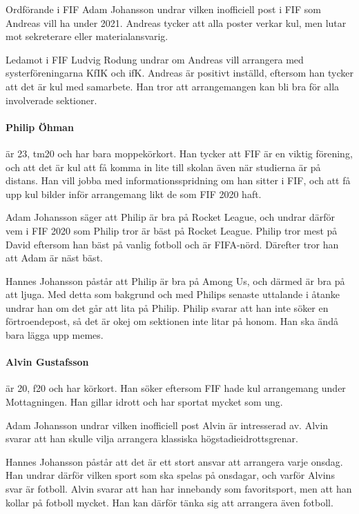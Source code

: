 \documentclass[hidelinks]{sektionsmote}
\begin{document}
Ordförande i FIF Adam Johansson undrar vilken inofficiell post i FIF som Andreas vill ha under 2021.
Andreas tycker att alla poster verkar kul, men lutar mot sekreterare eller materialansvarig.

Ledamot i FIF Ludvig Rodung undrar om Andreas vill arrangera med systerföreningarna KfIK och ifK.
Andreas är positivt inställd, eftersom han tycker att det är kul med samarbete.
Han tror att arrangemangen kan bli bra för alla involverade sektioner.

\paragraph{Philip Öhman} är 23, tm20 och har bara moppekörkort.
Han tycker att FIF är en viktig förening, och att det är kul att få komma in lite till skolan även när studierna är på distans.
Han vill jobba med informationsspridning om han sitter i FIF, och att få upp kul bilder inför arrangemang likt de som FIF 2020 haft.

Adam Johansson säger att Philip är bra på Rocket League, och undrar därför vem i FIF 2020 som Philip tror är bäst på Rocket League.
Philip tror mest på David eftersom han bäst på vanlig fotboll och är FIFA-nörd.
Därefter tror han att Adam är näst bäst.

Hannes Johansson påstår att Philip är bra på Among Us, och därmed är bra på att ljuga.
Med detta som bakgrund och med Philips senaste uttalande i åtanke undrar han om det går att lita på Philip.
Philip svarar att han inte söker en förtroendepost, så det är okej om sektionen inte litar på honom.
Han ska ändå bara lägga upp memes.

\paragraph{Alvin Gustafsson} är 20, f20 och har körkort.
Han söker eftersom FIF hade kul arrangemang under Mottagningen.
Han gillar idrott och har sportat mycket som ung.

Adam Johansson undrar vilken inofficiell post Alvin är intresserad av.
Alvin svarar att han skulle vilja arrangera klassiska högstadieidrottsgrenar.

Hannes Johansson påstår att det är ett stort ansvar att arrangera varje onsdag.
Han undrar därför vilken sport som ska spelas på onsdagar, och varför Alvins svar är fotboll.
Alvin svarar att han har innebandy som favoritsport, men att han kollar på fotboll mycket.
Han kan därför tänka sig att arrangera även fotboll.
\end{document}
